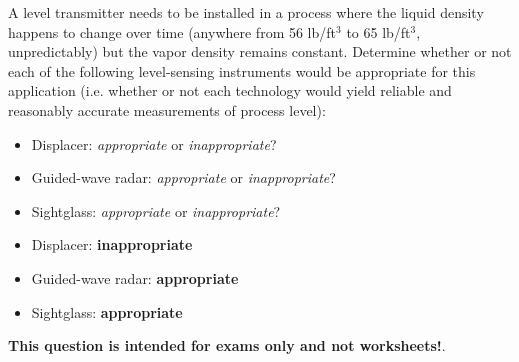 

A level transmitter needs to be installed in a process where the liquid density happens to change over time (anywhere from 56 lb/ft$^{3}$ to 65 lb/ft$^{3}$, unpredictably) but the vapor density remains constant.  Determine whether or not each of the following level-sensing instruments would be appropriate for this application (i.e. whether or not each technology would yield reliable and reasonably accurate measurements of process level):

\begin{itemize}
\item{} Displacer: {\it appropriate} or {\it inappropriate}?
\vskip 10pt
\item{} Guided-wave radar: {\it appropriate} or {\it inappropriate}?
\vskip 10pt
\item{} Sightglass: {\it appropriate} or {\it inappropriate}?
\end{itemize}







\begin{itemize}
\item{} Displacer: {\bf inappropriate}
\vskip 10pt
\item{} Guided-wave radar: {\bf appropriate}
\vskip 10pt
\item{} Sightglass: {\bf appropriate}
\end{itemize}







{\bf This question is intended for exams only and not worksheets!}.



